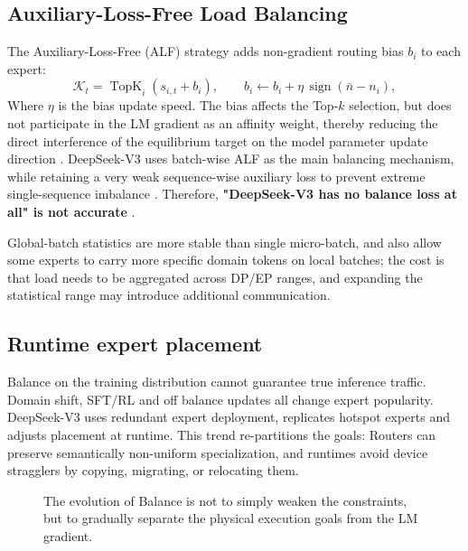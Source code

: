 \documentclass[10pt,a4paper,fontset=none]{ctexart}
\newcommand{\term}[1]{\textbf{#1}}
\begin{document}
\subsection{Auxiliary-Loss-Free Load Balancing}

The Auxiliary-Loss-Free (ALF) strategy adds non-gradient routing bias $b_i$ to each expert:
\begin{equation}
  \mathcal{K}_t=\operatorname{TopK}_i(s_{i,t}+b_i),\qquad
  b_i\leftarrow b_i+\eta\,\operatorname{sign}(\bar n-n_i),
  \label{en:eq:alf}
\end{equation}
Where $\eta$ is the bias update speed. The bias affects the Top-$k$ selection, but does not participate in the LM gradient as an affinity weight, thereby reducing the direct interference of the equilibrium target on the model parameter update direction \cite{en:wang2024auxfree}. DeepSeek-V3 uses batch-wise ALF as the main balancing mechanism, while retaining a very weak sequence-wise auxiliary loss to prevent extreme single-sequence imbalance \cite{en:deepseekv3}. Therefore, \term{ "DeepSeek-V3 has no balance loss at all" is not accurate }.

Global-batch statistics are more stable than single micro-batch, and also allow some experts to carry more specific domain tokens on local batches; the cost is that load needs to be aggregated across DP/EP ranges, and expanding the statistical range may introduce additional communication.

\subsection{Runtime expert placement}

Balance on the training distribution cannot guarantee true inference traffic. Domain shift, SFT/RL and off balance updates all change expert popularity. DeepSeek-V3 uses redundant expert deployment, replicates hotspot experts and adjusts placement\cite{en:deepseekv3} at runtime. This trend re-partitions the goals: Routers can preserve semantically non-uniform specialization, and runtimes avoid device stragglers by copying, migrating, or relocating them.

\begin{figure}[htbp]
\centering
{}
\caption{The evolution of Balance is not to simply weaken the constraints, but to gradually separate the physical execution goals from the LM gradient.}
\label{en:fig:balance}
\end{figure}
\end{document}
